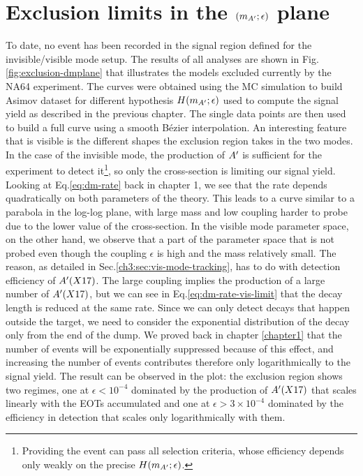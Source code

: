 
\section{Exclusion limits in the $(m_{A'};\epsilon)$ plane}
\label{ch4:sec:exclusion-limits}

To date, no event has been recorded in the signal region defined for the invisible/visible mode setup. The results of all analyses are shown in Fig.\ref{fig:exclusion-dmplane} that illustrates the models excluded currently by the NA64 experiment. The curves were obtained using the MC simulation to build Asimov dataset for different hypothesis $H(m_{A'};\epsilon)$ used to compute the signal yield as described in the previous chapter. The single data points are then used to build a full curve using a smooth Bézier interpolation. An interesting feature that is visible is the different shapes the exclusion region takes in the two modes. In the case of the invisible mode, the production of $A'$ is sufficient for the experiment to detect it\footnote{Providing the event can pass all selection criteria, whose efficiency depends only weakly on the precise $H(m_{A'};\epsilon)$.}, so only the cross-section is limiting our signal yield. Looking at Eq.\ref{eq:dm-rate} back in chapter 1, we see that the rate depends quadratically on both parameters of the theory. This leads to a curve similar to a parabola in the log-log plane, with large mass and low coupling harder to probe due to the lower value of the cross-section. In the visible mode parameter space, on the other hand, we observe that a part of the parameter space that is not probed even though the coupling $\epsilon$ is high and the mass relatively small. The reason, as detailed in Sec.\ref{ch3:sec:vis-mode-tracking}, has to do with detection efficiency of $A'(X17)$. The large coupling implies the production of a large number of $A'(X17)$, but we can see in Eq.\ref{eq:dm-rate-vis-limit} that the decay length is reduced at the same rate. Since we can only detect decays that happen outside the target, we need to consider the exponential distribution of the decay only from the end of the dump. We proved back in chapter \ref{chapter1} that the number of events will be exponentially suppressed because of this effect, and increasing the number of events contributes therefore only logarithmically to the signal yield. The result can be observed in the plot: the exclusion region shows two regimes, one at $\epsilon < 10^{-4}$ dominated by the production of $A'(X17)$ that scales linearly with the EOTs accumulated and one at $\epsilon > 3 \times 10^{-4}$ dominated by the efficiency in detection that scales only logarithmically with them.

